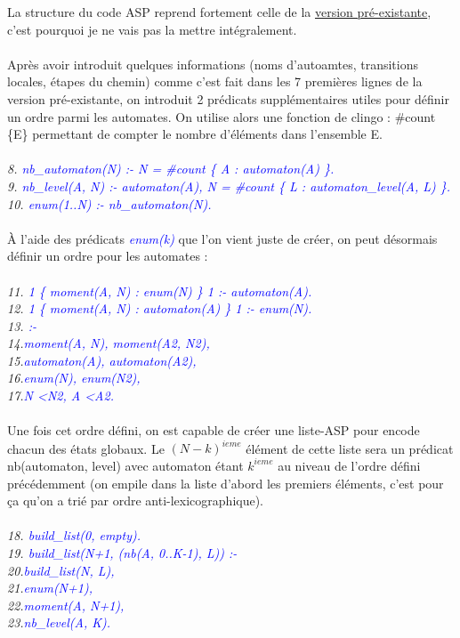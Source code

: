 \documentclass[12pt,a4paper]{article}
\begin{document}
La structure du code ASP reprend fortement celle de la \hyperlink{preexistante}{version pré-existante}, c'est pourquoi je ne vais pas la mettre intégralement.\\ \\
Après avoir introduit quelques informations (noms d'autoamtes, transitions locales, étapes du chemin) comme c'est fait dans les 7 premières lignes de la version pré-existante, on introduit 2 prédicats supplémentaires utiles pour 
définir un ordre parmi les automates. On utilise alors une fonction de clingo : \#count \{E\} permettant de compter le nombre d'éléments dans l'ensemble E.\\ \\
\emph{
	8. \textcolor{blue}{nb\_automaton(N) :- N = \#count \{ A : automaton(A) \}.}\\
	9. \textcolor{blue}{nb\_level(A, N) :- automaton(A), N = \#count \{ L : automaton\_level(A, L) \}.}\\
	10. \textcolor{blue}{enum(1..N) :- nb\_automaton(N).}\\ \\
}
\`A l'aide des prédicats \emph{\textcolor{blue}{enum(k)}} que l'on vient juste de créer, on peut désormais définir un ordre pour les automates :\\ \\
\emph{
	11. \textcolor{blue}{1 \{ moment(A, N) : enum(N) \} 1 :- automaton(A).}\\
	12. \textcolor{blue}{1 \{ moment(A, N) : automaton(A) \} 1 :- enum(N).}\\
	13. \textcolor{blue}{:- }\\
	14.\qquad\textcolor{blue}{moment(A, N), moment(A2, N2),}\\
	15.\qquad\textcolor{blue}{automaton(A), automaton(A2),}\\
	16.\qquad\textcolor{blue}{enum(N), enum(N2),}\\
	17.\qquad\textcolor{blue}{N \textless N2, A \textless A2.}\\ \\
}
Une fois cet ordre défini, on est capable de créer une liste-ASP pour encode chacun des états globaux. Le $(N-k)^{ieme}$ élément de cette liste sera un prédicat nb(automaton, level) avec automaton étant $k^{ieme}$ au niveau de 
l'ordre défini précédemment (on empile dans la liste d'abord les premiers éléments, c'est pour ça qu'on a trié par ordre anti-lexicographique).\\ \\
\emph{
	18. \textcolor{blue}{build\_list(0, empty).}\\
	19. \textcolor{blue}{build\_list(N+1, (nb(A, 0..K-1), L)) :-}\\ 
	20.\qquad\textcolor{blue}{build\_list(N, L),}\\
	21.\qquad\textcolor{blue}{enum(N+1),}\\
	22.\qquad\textcolor{blue}{moment(A, N+1),}\\
	23.\qquad\textcolor{blue}{nb\_level(A, K).}\\ \\
}
\end{document}
